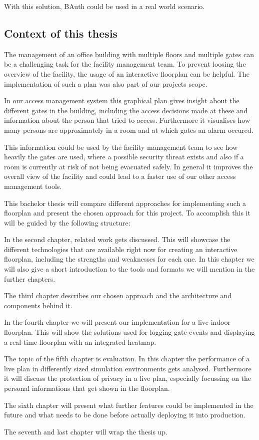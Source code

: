 With this solution, BAuth could be used in a real world scenario.

\subsection{Context of this thesis}
\label{Context of this thesis}

The management of an office building with multiple floors and multiple gates can be a challenging task for the facility management team. To prevent loosing the overview of the facility, the usage of an interactive floorplan can be helpful. The implementation of such a plan was also part of our projects scope.

In our access management system this graphical plan gives insight about the different gates in the building, including the access decisions made at these and information about the person that tried to access. Furthermore it visualises how many persons are approximately in a room and at which gates an alarm occured. 

This information could be used by the facility management team to see how heavily the gates are used, where a possible security threat exists and also if a room is currently at risk of not being evacuated safely. 
In general it improves the overall view of the facility and could lead to a faster use of our other access management tools.

This bachelor thesis will compare different approaches for implementing such a floorplan and present the chosen approach for this project. To accomplish this it will be guided by the following structure:

In the second chapter, related work gets discussed. This will showcase the different technologies that are available right now for creating an interactive floorplan, including the strengths and weaknesses for each one. In this chapter we will also give a short introduction to the tools and formats we will mention in the further chapters.

The third chapter describes our chosen approach and the architecture and components behind it.

In the fourth chapter we will present our implementation for a live indoor floorplan. This will show the solutions used for logging gate events and displaying a real-time floorplan with an integrated heatmap.

The topic of the fifth chapter is evaluation. In this chapter the performance of a live plan in differently sized simulation environments gets analysed. Furthermore it will discuss the protection of privacy in a live plan, especially focussing on the personal informations that get shown in the floorplan.

The sixth chapter will present what further features could be implemented in the future and what needs to be done before actually deploying it into production. 

The seventh and last chapter will wrap the thesis up.

\clearpage